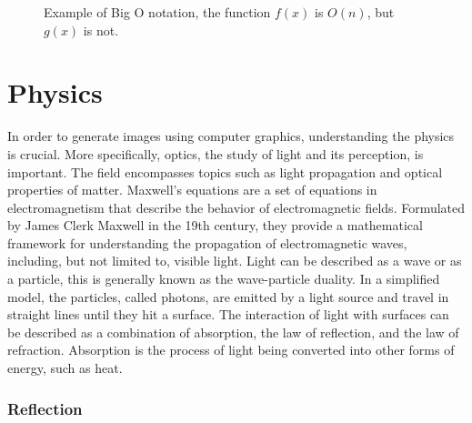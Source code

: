 \begin{figure}[H]
  \centering
  \caption{Example of Big O notation, the function $f(x)$ is $O(n)$, but $g(x)$ is not.}
  \label{fig:big-o-visualization}
\end{figure}

\section{Physics}
\label{ch:physics}

In order to generate images using computer graphics, understanding the physics is crucial. More specifically, optics, the study of light and its perception, is important. The field encompasses topics such as light propagation and optical properties of matter. Maxwell's equations are a set of equations in electromagnetism that describe the behavior of electromagnetic fields. Formulated by James Clerk Maxwell in the 19th century, they provide a mathematical framework for understanding the propagation of electromagnetic waves, including, but not limited to, visible light. Light can be described as a wave or as a particle, this is generally known as the wave-particle duality. \cite{fowles1989introduction} In a simplified model, the particles, called photons, are emitted by a light source and travel in straight lines until they hit a surface. The interaction of light with surfaces can be described as a combination of absorption, the law of reflection, and the law of refraction. Absorption is the process of light being converted into other forms of energy, such as heat.

\subsubsection{Reflection}

